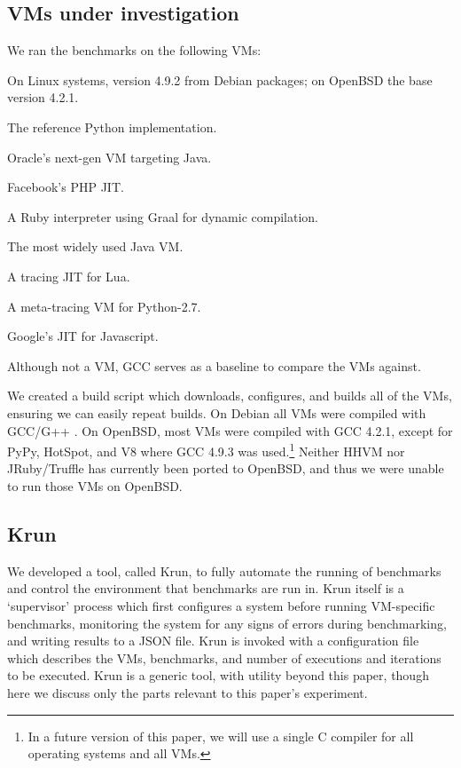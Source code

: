 \documentclass[10pt,preprint]{sigplanconf}
\newcommand{\krun}{Krun\xspace}
\begin{document}
\subsection{VMs under investigation}

We ran the benchmarks on the following VMs:
\begin{description*}
\item[GCC] On Linux systems, version 4.9.2 from Debian packages; on OpenBSD the base version 4.2.1.
\item[CPython 2.7.10] The reference Python implementation.
\item[Graal \#9dafd1dc5ff9] Oracle's next-gen VM targeting Java.
\item[HHVM 3.7.1] Facebook's PHP JIT.
\item[JRuby/Truffle \#7f4cd59cdd1c8] A Ruby interpreter using Graal for dynamic compilation.
\item[HotSpot 8u45b14] The most widely used Java VM.
\item[LuaJIT 2.0.4] A tracing JIT for Lua.
\item[PyPy 4.0.0] A meta-tracing VM for Python-2.7.
\item[V8 4.8.271.9] Google's JIT for Javascript.
\end{description*}
Although not a VM, GCC serves as a baseline to compare the VMs against.

We created a build script which downloads, configures, and builds all of the
VMs, ensuring we can easily repeat builds.
On Debian all VMs were compiled with GCC/G++ . On OpenBSD,
most VMs were compiled with GCC 4.2.1, except for PyPy, HotSpot, and V8 where
GCC 4.9.3 was used.\footnote{In a future version of this paper, we will use a
single C compiler for all operating systems and all VMs.} Neither HHVM nor
JRuby/Truffle has currently been ported to OpenBSD, and thus we were unable to
run those VMs on OpenBSD.


\subsection{\krun}

We developed a tool, called \krun, to fully automate the running of benchmarks
and control the environment that benchmarks are run in. \krun itself is a
`supervisor' process which first configures a system before running VM-specific
benchmarks, monitoring the system for any signs of errors during benchmarking,
and writing results to a JSON file. \krun is invoked with a configuration file
which describes the VMs, benchmarks, and number of executions and iterations to
be executed. \krun is a generic tool, with utility beyond this paper, though
here we discuss only the parts relevant to this paper's experiment. 
\end{document}
